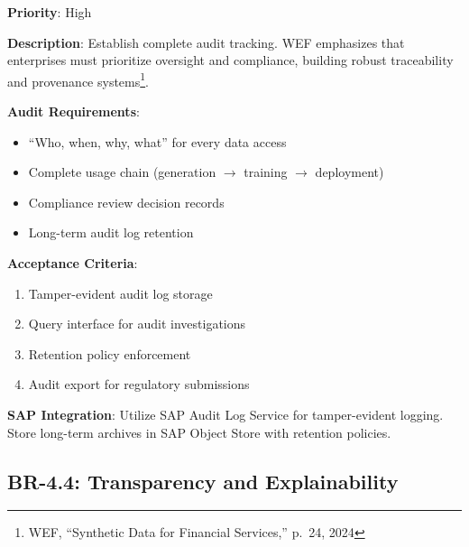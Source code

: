 \begin{tcolorbox}[colback=red!5,colframe=red!70,title=BR-4.3: Complete Audit Trail]
\textbf{Priority}: High

\textbf{Description}: Establish complete audit tracking. WEF emphasizes that
enterprises must prioritize oversight and compliance, building robust traceability
and provenance systems\footnote{WEF, ``Synthetic Data for Financial Services,''
p.~24, 2024}.

\textbf{Audit Requirements}:
\begin{itemize}
  \item ``Who, when, why, what'' for every data access
  \item Complete usage chain (generation $\to$ training $\to$ deployment)
  \item Compliance review decision records
  \item Long-term audit log retention
\end{itemize}

\textbf{Acceptance Criteria}:
\begin{enumerate}
  \item Tamper-evident audit log storage
  \item Query interface for audit investigations
  \item Retention policy enforcement
  \item Audit export for regulatory submissions
\end{enumerate}

\textbf{SAP Integration}: Utilize SAP Audit Log Service for tamper-evident logging.
Store long-term archives in SAP Object Store with retention policies.
\end{tcolorbox}

\subsection{BR-4.4: Transparency and Explainability}

